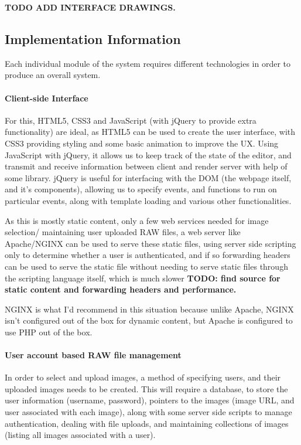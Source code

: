 \documentclass[12pt,a4paper]{article}
\begin{document}
\textbf{TODO ADD INTERFACE DRAWINGS.}

\subsection{Implementation Information}
Each individual module of the system requires different technologies in order to
produce an overall system.

\paragraph{Client-side Interface}
For this, HTML5, CSS3 and JavaScript (with jQuery to provide extra functionality)
are ideal, as HTML5 can be used to create the user interface, with CSS3 providing styling
and some basic animation to improve the UX. Using JavaScript with jQuery, it allows us
to keep track of the state of the editor, and transmit and receive information between client and
render server with help of some library. jQuery is useful for interfacing with the
DOM (the webpage itself, and it's components), allowing us to specify events, and functions
to run on particular events, along with template loading and various other functionalities.

As this is mostly static content, only a few web services needed for image selection/
maintaining user uploaded RAW files, a web server like Apache/NGINX can be used to serve
these static files, using server side scripting only to determine whether a user is authenticated,
and if so forwarding headers can be used to serve the static file without needing to serve static files
through the scripting language itself, which is much slower
\textbf{TODO: find source for static content and forwarding headers and performance.}

NGINX is what I'd recommend in this situation because unlike Apache, NGINX isn't
configured out of the box for dynamic content, but Apache is configured to use PHP
out of the box.

\paragraph{User account based RAW file management}
In order to select and upload images, a method of specifying users, and their uploaded
images needs to be created. This will require a database, to store the user information (username,
password), pointers to the images (image URL, and user associated with each image), along with some
server side scripts to manage authentication, dealing with file uploads, and maintaining collections
of images (listing all images associated with a user).
\end{document}
